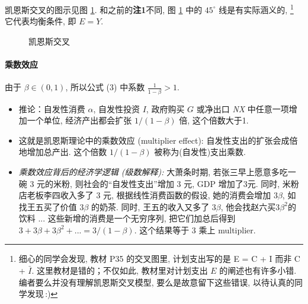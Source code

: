 \documentclass[11pt]{ctexart}
\begin{document}
凯恩斯交叉的图示见图 \ref{fig:cross}. 和之前的\textbf{注1}不同,
图 \ref{fig:cross} 中的 $45^\circ$ 线是有实际涵义的,%
   \footnote{细心的同学会发现, 教材 P35 的交叉图里, 计划支出写的是 E = C + I 而非 C + $\bar{I}$. 这里教材是错的；不仅如此, 教材里对计划支出 $E$ 的阐述也有许多小错. 编者要么并没有理解凯恩斯交叉模型, 要么是故意留下这些错误, 以待认真的同学发现$\,$:)}
它代表均衡条件, 即 $E=Y$.

\begin{figure}[H]
\centering
{}
\caption{凯恩斯交叉}
\label{fig:cross}
\end{figure}

\paragraph{乘数效应}   由于 $\beta \in  (0, 1)$,  所以公式  (3) 中系数 $\frac{1}{1-\beta} > 1$.
\begin{itemize}
  \item
    推论：自发性消费 $\alpha$,  自发性投资 $I$,  政府购买 $G$ 或净出口 \textit{NX}
    中任意一项增加一个单位, 经济产出都会扩张 $1/ (1-\beta)$ 倍, 这个倍数大于1. 
  \item
    这就是凯恩斯理论中的乘数效应  (multiplier effect):
    自发性支出的扩张会成倍地增加总产出. 这个倍数 $1/ (1-\beta)$
    被称为(自发性)支出乘数.

  \item
    \textit{乘数效应背后的经济学逻辑 (级数解释):} 大萧条时期, 若张三早上愿意多吃一碗 3
    元的米粉, 则社会的``自发性支出''增加 3 元, GDP
    增加了3元. 同时, 米粉店老板李四收入多了 3
    元, 根据线性消费函数的假设, 她的消费会增加 $3\beta$, 
    如找王五买了价值 $3 \beta$ 的奶茶. 同时, 王五的收入又多了
    $3 \beta$, 他会找赵六买$3 \beta^2$的饮料 ...
    这些新增的消费是一个无穷序列, 把它们加总后得到 $3 + 3 \beta + 3 \beta^2 + ... = 3/ (1-\beta)$.
    这个结果等于 3 乘上 multiplier.
  \end{itemize}
\end{document}
